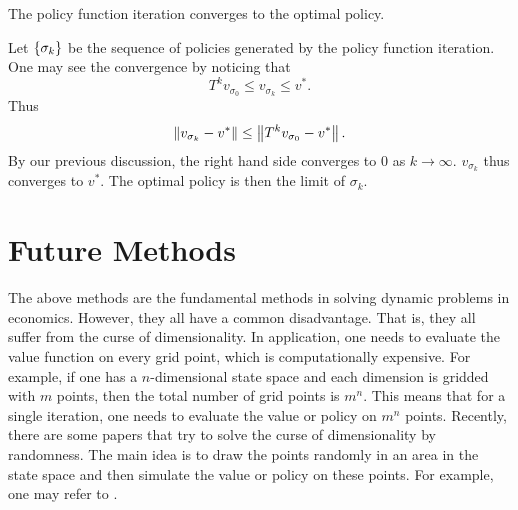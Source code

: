 \documentclass[12pt]{article}
\begin{document}
\begin{corollary}
    The policy function iteration converges to the optimal policy.
\end{corollary}
\begin{pf}
    Let $\left\{ {\sigma_k} \right\}$ be the sequence of policies generated by 
    the policy function iteration. One may see the convergence by 
    noticing that 
    \begin{equation}
        T^k v_{\sigma_0} \leq v_{\sigma_k} \leq v^*.
    \end{equation}
    Thus 
    \begin{equation}
        \left\lVert {v_{\sigma_k} - v^*} \right\rVert \leq \left\lVert {T^k v_{\sigma_0} - v^*} \right\rVert.
    \end{equation}
    By our previous discussion, the right hand side converges to 
    $0$ as $k\to\infty$. $v_{\sigma_k}$ thus converges to $v^*$. 
    The optimal policy is then the limit of $\sigma_k$.
\end{pf}

\section{Future Methods}
The above methods are the fundamental methods in solving dynamic 
problems in economics. However, they all have a common disadvantage. 
That is, they all suffer from the curse of dimensionality. In 
application, one needs to evaluate the value function on every 
grid point, which is computationally expensive. For example, 
if one has a $n$-dimensional state space and each dimension is 
gridded with $m$ points, then the total number of grid points 
is $m^n$. This means that for a single iteration, one needs to 
evaluate the value or policy on $m^n$ points. Recently, there are 
some papers that try to solve the curse of dimensionality by 
randomness. The main idea is to draw the points randomly in an 
area in the state space and then simulate the value or policy 
on these points. For example, one may refer to \cite{maliar2021}.



\end{document}
